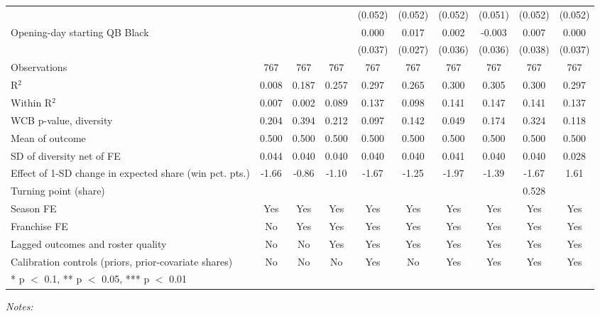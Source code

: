 \begin{table}[!h]
{\begin{threeparttable}
\begin{tabular}[t]{lccccccccc}
 &  &  &  & (0.052) & (0.052) & (0.052) & (0.051) & (0.052) & (0.052)\\
Opening-day starting QB Black &  &  &  & 0.000 & 0.017 & 0.002 & -0.003 & 0.007 & 0.000\\
 &  &  &  & (0.037) & (0.027) & (0.036) & (0.036) & (0.038) & (0.037)\\
\midrule
Observations & 767 & 767 & 767 & 767 & 767 & 767 & 767 & 767 & 767\\
R$^2$ & 0.008 & 0.187 & 0.257 & 0.297 & 0.265 & 0.300 & 0.305 & 0.300 & 0.297\\
Within R$^2$ & 0.007 & 0.002 & 0.089 & 0.137 & 0.098 & 0.141 & 0.147 & 0.141 & 0.137\\
WCB p-value, diversity & 0.204 & 0.394 & 0.212 & 0.097 & 0.142 & 0.049 & 0.174 & 0.324 & 0.118\\
Mean of outcome & 0.500 & 0.500 & 0.500 & 0.500 & 0.500 & 0.500 & 0.500 & 0.500 & 0.500\\
SD of diversity net of FE & 0.044 & 0.040 & 0.040 & 0.040 & 0.040 & 0.041 & 0.040 & 0.040 & 0.028\\
Effect of 1-SD change in expected share (win pct. pts.) & -1.66 & -0.86 & -1.10 & -1.67 & -1.25 & -1.97 & -1.39 & -1.67 & 1.61\\
Turning point (share) &  &  &  &  &  &  &  & 0.528 & \\
Season FE & Yes & Yes & Yes & Yes & Yes & Yes & Yes & Yes & Yes\\
Franchise FE & No & Yes & Yes & Yes & Yes & Yes & Yes & Yes & Yes\\
Lagged outcomes and roster quality & No & No & Yes & Yes & Yes & Yes & Yes & Yes & Yes\\
Calibration controls (priors, prior-covariate shares) & No & No & No & Yes & No & Yes & Yes & Yes & Yes\\
\bottomrule
\multicolumn{10}{l}{\rule{0pt}{1em}* p $<$ 0.1, ** p $<$ 0.05, *** p $<$ 0.01}\\
\end{tabular}
\begin{tablenotes}[para]
\item \textit{Notes:} 

\end{tablenotes}
\end{threeparttable}}
\end{table}
